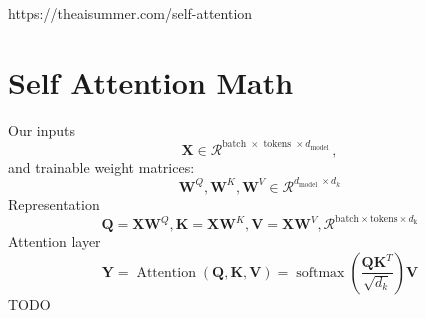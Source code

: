 \documentclass[12pt]{article}
\begin{document}
https://theaisummer.com/self-attention
\section*{Self Attention Math}


Our inputs
$$
\mathbf{X} \in \mathcal{R}^{\text {batch } \times \text { tokens } \times d_{\text {model }}},
$$
and trainable weight matrices:
$$
\mathbf{W}^Q, \mathbf{W}^K, \mathbf{W}^V \in \mathcal{R}^{d_{\text {model }} \times d_k}
$$
Representation
$$
\mathbf{Q} = \mathbf{X}\mathbf{W}^Q,
\mathbf{K} = \mathbf{X}\mathbf{W}^K,
\mathbf{V} = \mathbf{X}\mathbf{W}^V,
\mathcal{R}^{\text{batch} \times \text{tokens} \times d_{\text{k}}}
$$
Attention layer
$$
\mathbf{Y}=
\operatorname{Attention}(\mathbf{Q}, \mathbf{K}, \mathbf{V})=
\operatorname{softmax}\left(\frac{\mathbf{Q} \mathbf{K}^T}{\sqrt{d_k}}\right) \mathbf{V}
$$
TODO
\end{document}
